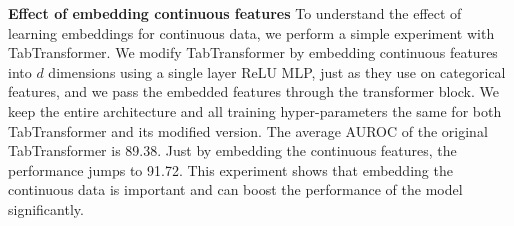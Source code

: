 \documentclass{article}
\newcommand{\gowthami}[1]{\textcolor{red}{#1}}
\newcommand{\tom}[1]{\textcolor{green}{#1}}
\begin{document}
\textbf{Effect of embedding continuous features} To understand the effect of learning embeddings for continuous data, we perform a simple experiment with TabTransformer. We modify TabTransformer by embedding continuous features 
into $d$ dimensions using a single layer ReLU MLP, just as they use on categorical features, and we pass the embedded features through the transformer block. We keep the entire architecture and all training hyper-parameters the same for both TabTransformer and its modified version. The average AUROC of the original TabTransformer is 89.38. Just by embedding the continuous features, the performance jumps to 91.72. This experiment shows that embedding the continuous data is important and can boost the performance of the model significantly. 
\end{document}
